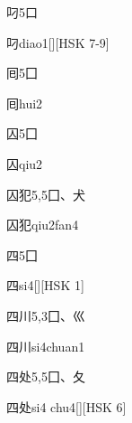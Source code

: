 \begin{Entry}{叼}{5}{⼝}
  \begin{Phonetics}{叼}{diao1}[][HSK 7-9]
  \end{Phonetics}
\end{Entry}

\begin{Entry}{囘}{5}{⼞}
  \begin{Phonetics}{囘}{hui2}
  \end{Phonetics}
\end{Entry}

\begin{Entry}{囚}{5}{⼞}
  \begin{Phonetics}{囚}{qiu2}
  \end{Phonetics}
\end{Entry}

\begin{Entry}{囚犯}{5,5}{⼞、⽝}
  \begin{Phonetics}{囚犯}{qiu2fan4}
  \end{Phonetics}
\end{Entry}

\begin{Entry}{四}{5}{⼞}
  \begin{Phonetics}{四}{si4}[][HSK 1]
  \end{Phonetics}
\end{Entry}

\begin{Entry}{四川}{5,3}{⼞、⼮}
  \begin{Phonetics}{四川}{si4chuan1}
  \end{Phonetics}
\end{Entry}

\begin{Entry}{四处}{5,5}{⼞、⼡}
  \begin{Phonetics}{四处}{si4 chu4}[][HSK 6]
  \end{Phonetics}
\end{Entry}

